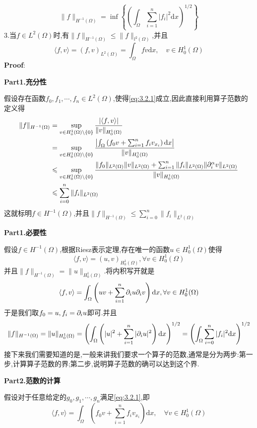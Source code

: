 $$
\|f\|_{H^{-1}(\Omega)}=\inf\left\{\left(\int_\Omega \sum^{n}_{i=1}|f_i|^2\mathrm{d}x\right)^{1/2}\right\}
$$
\qquad
3.当$f\in L^2(\Omega)$时,有$\|f\|_{H^{-1}(\Omega)}\leqslant \|f\|_{l^2(\Omega)}$,并且
$$
\langle f,v\rangle=(f,v)_{L^2(\Omega)}=\int_\Omega fv\mathrm{d}x,\quad v\in H^1_0(\Omega)
$$
\qquad \textbf{Proof}:\par
\textbf{Part1.充分性}\par
假设存在函数$f_0,f_1,\cdots,f_n\in L^2(\Omega)$,使得\eqref{eq:3.2.1}成立,因此直接利用算子范数的定义得
$$
\begin{aligned}
    \|f\|_{H^{-1}(\Omega)} &= \sup\limits_{v\in H^1_0(\Omega)\setminus \{0\}}\frac{\left|\langle f,v\rangle\right|}{\|v\|_{H^1_0(\Omega)}}\\
                           &= \sup\limits_{v\in H^1_0(\Omega)\setminus \{0\}}\frac{\left|\int_\Omega\left(f_0v+\sum^{n}_{i=1}f_iv_{x_i}\right)\mathrm{d}x\right|}{\|v\|_{H^1_0(\Omega)}}\\
                           &\leqslant \sup\limits_{v\in H^1_0(\Omega)\setminus \{0\}}\frac{\|f_0\|_{L^2(\Omega)}\|v\|_{L^2(\Omega)}+\sum_{i=1}^n\|f_i\|_{L^2(\Omega)}\|\partial ^{\alpha}_iv\|_{L^2(\Omega)}}{\|v\|_{H^1_0(\Omega)}}\\
                           &\leqslant \sum_{i=0}^n\|f_i\|_{L^2(\Omega)}
\end{aligned}
$$
这就标明$f\in H^{-1}(\Omega)$,并且$\|f\|_{H^{-1}(\Omega)}\leqslant \sum_{i=0}^n\|f_i\|_{L^2(\Omega)}$\par
\textbf{Part1.必要性}\par
假设$f\in H^{-1}(\Omega)$,根据Riesz表示定理,存在唯一的函数$u\in H^1_0(\Omega)$使得
$$
\langle f,v\rangle=(u,v)_{H^1_0(\Omega)},\forall  v\in H^1_0(\Omega)
$$
并且$\|f\|_{H^{-1}(\Omega)}=\|u\|_{H^1_0(\Omega)}$.将内积写开就是
$$
\langle f,v\rangle=\int_{\Omega}\left(uv+\sum_{i=1}^n\partial_{i}u\partial_i v\right)\mathrm{d}x,\forall  v\in H^1_0(\Omega)
$$
于是我们取$f_0=u,f_i=\partial_i u$即可.并且
$$
\|f\|_{H^{-1}(\Omega)}=\|u\|_{H^1_0(\Omega)}=\left(\int_{\Omega}\left(|u|^2+\sum_{i=1}^n|\partial_i u|^2\right)\mathrm{d}x\right)^{1/2}=\left(\int_{\Omega}\sum_{i=0}^n|f_i|^2\mathrm{d}x\right)^{1/2}
$$
接下来我们需要知道的是,一般来讲我们要求一个算子的范数,通常是分为两步:第一步,计算算子范数的界;第二步,说明算子范数的确可以达到这个界.\par
\textbf{Part2.范数的计算}\par
假设对于任意给定的$g_0,g_1,\cdots,g_n$满足\eqref{eq:3.2.1},即
$$
\langle f,v\rangle=\int_\Omega\left(f_0v+\sum^{n}_{i=1}f_iv_{x_i}\right)\mathrm{d}x,\quad \forall v\in H^1_0(\Omega)
$$
